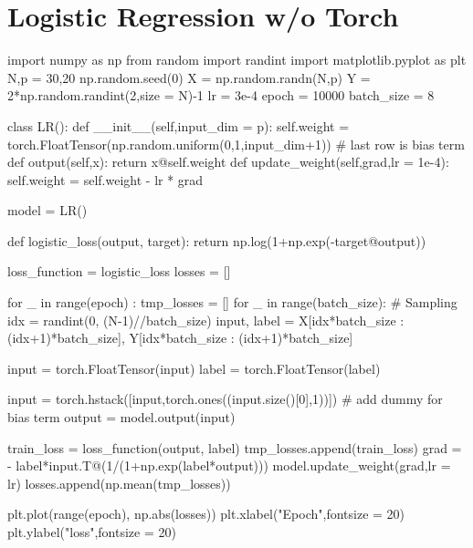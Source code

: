 \documentclass[10pt]{article}
\begin{document}
\section{Logistic Regression w/o Torch}
\begin{python}
import numpy as np
from random import randint
import matplotlib.pyplot as plt
N,p = 30,20
np.random.seed(0)
X = np.random.randn(N,p)
Y = 2*np.random.randint(2,size = N)-1
lr = 3e-4
epoch = 10000
batch_size = 8

class LR():
    def __init__(self,input_dim = p):
        self.weight = torch.FloatTensor(np.random.uniform(0,1,input_dim+1)) # last row is bias term
    def output(self,x):
        return x@self.weight
    def update_weight(self,grad,lr = 1e-4):
        self.weight = self.weight - lr * grad

model = LR()

def logistic_loss(output, target):
    return np.log(1+np.exp(-target@output))

loss_function = logistic_loss                                                   
losses = []

for _ in range(epoch) :
    tmp_losses = []
    for _ in range(batch_size):
        # Sampling
        idx = randint(0, (N-1)//batch_size)
        input, label = X[idx*batch_size : (idx+1)*batch_size], Y[idx*batch_size : (idx+1)*batch_size]

        input = torch.FloatTensor(input)
        label = torch.FloatTensor(label)

        input = torch.hstack([input,torch.ones((input.size()[0],1))]) # add dummy for bias term
        output = model.output(input)

        
        train_loss = loss_function(output, label)
        tmp_losses.append(train_loss)
        grad = - label*input.T@(1/(1+np.exp(label*output)))
        model.update_weight(grad,lr = lr)
    losses.append(np.mean(tmp_losses))
    
plt.plot(range(epoch), np.abs(losses))
plt.xlabel("Epoch",fontsize = 20)
plt.ylabel("loss",fontsize = 20)
\end{python}
\end{document}
